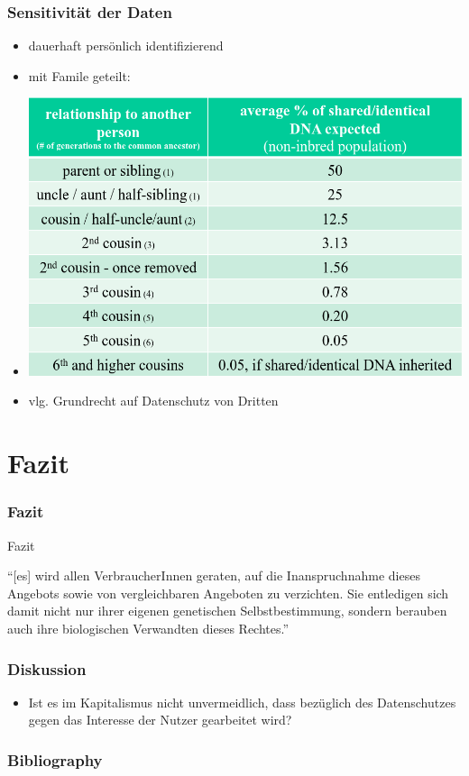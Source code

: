 \documentclass{beamer}
\begin{document}
\begin{frame}
  \frametitle{Sensitivität der Daten}

  \begin{itemize}
    \item dauerhaft persönlich identifizierend
    \item mit Famile geteilt:
    \item \includegraphics[scale=0.18]{shared-dna}\autocite{tedx}
    \item vlg. Grundrecht auf Datenschutz von Dritten\autocite{ancestryGER}
  \end{itemize}
\end{frame}

\section{Fazit}
\begin{frame}[allowframebreaks]
  \frametitle{Fazit}

  \begin{center}
    {\Huge Fazit}
  \end{center}

  \break

  ``[es] wird allen VerbraucherInnen geraten, auf die Inanspruchnahme dieses
  Angebots sowie von vergleichbaren Angeboten zu verzichten. Sie entledigen sich
  damit nicht nur ihrer eigenen genetischen Selbstbestimmung, sondern berauben
  auch ihre biologischen Verwandten dieses Rechtes.''\autocite{ancestryGER}
\end{frame}

\begin{frame}
  \frametitle{Diskussion}

  \begin{itemize}
    \item Ist es im Kapitalismus nicht unvermeidlich, dass bezüglich des Datenschutzes
gegen das Interesse der Nutzer gearbeitet wird?
  \end{itemize}
\end{frame}

\begin{frame}[allowframebreaks]
  \frametitle{Bibliography}
  \printbibliography
\end{frame}
\end{document}
